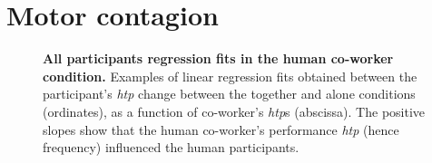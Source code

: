 \chapter{Motor contagion}

\begin{figure}[hpt]
	\caption{{\bf All participants regression fits in the human co-worker condition.} Examples of linear regression fits obtained between the participant's {\it htp} change between the together and alone conditions (ordinates), as a function of co-worker's {\it htp}s (abscissa). The positive slopes show that the human co-worker's performance {\it htp} (hence frequency) influenced the human participants.}
	\label{S2_Fig}
\end{figure}

